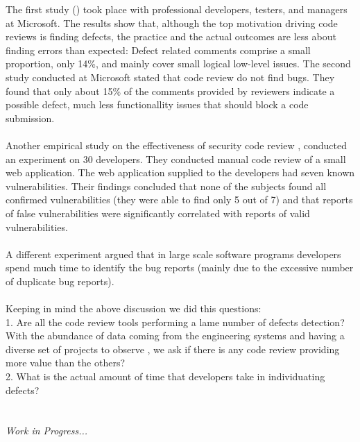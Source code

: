 \documentclass[ifip]{svmult}
\begin{document}
The first study (\cite{contribution9}) took place with professional developers, testers, and managers at Microsoft. 
The results show that, although the top motivation driving code reviews is finding defects, the practice and the 
actual outcomes are less about finding errors than expected: Defect related comments comprise a small proportion, only 14\%, 
and mainly cover small logical low-level issues.
The second study conducted at Microsoft \cite{contribution20} stated that code review do not find bugs. They found that only about 
15\% of the comments provided by reviewers indicate a possible defect, much less functionallity issues that should block a 
code submission. 
\\ \\
Another empirical study on the effectiveness of security code review \cite{contribution1}, conducted an experiment on 30 developers. They 
conducted manual code review of a small web application. The web application supplied to the developers had seven known vulnerabilities. 
Their findings concluded that none of the subjects found all confirmed vulnerabilities (they were able to find only 5 out of 7) 
and that reports of false vulnerabilities were significantly correlated with reports of valid vulnerabilities.
\\ \\
A different experiment \cite{contribution10} argued that in large scale software programs developers spend much time to 
identify the bug reports (mainly due to the excessive number of duplicate bug reports).
\\ \\
Keeping in mind the above discussion we did this questions:
\\
1. Are all the code review tools performing a lame number of defects detection?
With the abundance of data coming from the engineering systems and having a diverse set of projects to observe 
\cite{contribution12} \cite{contribution13}, we ask 
if there is any code review providing more value than the others?
\\
2. What is the actual amount of time that developers take in individuating defects?
\\
\\
\\
\textit{Work in Progress...}

\end{document}
